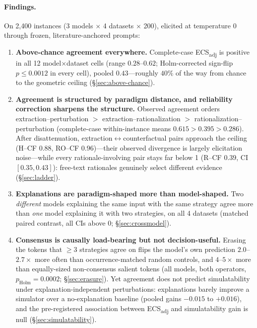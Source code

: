 \documentclass[11pt]{article}
\newcommand{\ecsadj}{\mbox{ECS\textsubscript{adj}}}
\newcommand{\holm}[1]{$p_{\mathrm{Holm}}{=}#1$}
\begin{document}
\paragraph{Findings.} On 2{,}400 instances (3 models $\times$ 4 datasets $\times$ 200), elicited at temperature 0 through frozen, literature-anchored prompts:
\begin{enumerate}[leftmargin=*,itemsep=1pt,topsep=2pt]
\item \textbf{Above-chance agreement everywhere.} Complete-case \ecsadj{} is positive in all 12 model$\times$dataset cells (range $0.28$--$0.62$; Holm-corrected sign-flip $p\le0.0012$ in every cell), pooled $0.43$---roughly $40\%$ of the way from chance to the geometric ceiling (\S\ref{sec:above-chance}).
\item \textbf{Agreement is structured by paradigm distance, and reliability correction sharpens the structure.} Observed agreement orders extraction--perturbation $>$ extraction--rationalization $>$ rationalization--perturbation (complete-case within-instance means $0.615 > 0.395 > 0.286$). After disattenuation, extraction$\leftrightarrow$counterfactual pairs approach the ceiling (H--CF $0.88$, RO--CF $0.96$)---their observed divergence is largely elicitation noise---while every rationale-involving pair stays far below 1 (R--CF $0.39$, CI $[0.35,0.43]$): free-text rationales genuinely select different evidence (\S\ref{sec:ladder}).
\item \textbf{Explanations are paradigm-shaped more than model-shaped.} Two \emph{different} models explaining the same input with the same strategy agree more than \emph{one} model explaining it with two strategies, on all 4 datasets (matched paired contrast, all CIs above 0; \S\ref{sec:crossmodel}).
\item \textbf{Consensus is causally load-bearing but not decision-useful.} Erasing the tokens that $\ge$3 strategies agree on flips the model's own prediction $2.0$--$2.7\times$ more often than occurrence-matched random controls, and $4$--$5\times$ more than equally-sized non-consensus salient tokens (all models, both operators, \holm{0.0002}; \S\ref{sec:erasure}). Yet agreement does not predict simulatability under explanation-independent perturbations: explanations barely improve a simulator over a no-explanation baseline (pooled gains $-0.015$ to $+0.016$), and the pre-registered association between \ecsadj{} and simulatability gain is null (\S\ref{sec:simulatability}).
\end{enumerate}
\end{document}

